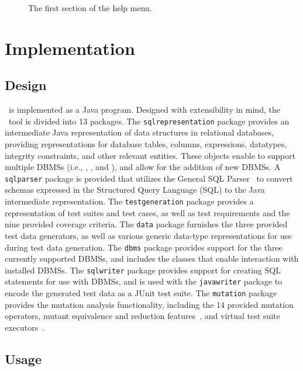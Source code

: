 \begin{figure}

\caption{\label{fig:usage} The first section of the \sa help menu.}
\end{figure}

\section{Implementation}\label{sec:implementation}
\subsection{Design}


\sa~is implemented as a Java program.  Designed with extensibility in mind, the \sa~tool is divided into 13 packages.
The \texttt{sqlrepresentation} package provides an intermediate Java representation of data structures in relational
databases, providing representations for database tables, columns, expressions, datatypes, integrity constraints, and
other relevant entities. These objects enable \sa to support multiple DBMSs (i.e., \sqlite, \postgres, and \hypersql),
and allow for the addition of new DBMSs. A \texttt{sqlparser} package is provided that utilizes the General SQL
Parser~\cite{} to convert schemas expressed in the Structured Query Language (SQL) to the Java intermediate
representation. The \texttt{testgeneration} package provides a representation of test suites and test cases, as well as
test requirements and the nine provided coverage criteria. The \texttt{data} package furnishes the three provided test
data generators, as well as various generic data-type representations for use during test data generation. The
\texttt{dbms} package provides support for the three currently supported DBMSs, and includes the classes that enable
interaction with installed DBMSs. The \texttt{sqlwriter} package provides support for creating SQL statements for use
with DBMSs, and is used with the \texttt{javawriter} package to encode the generated test data as a JUnit test suite.
The \texttt{mutation} package provides the mutation analysis functionality, including the 14 provided mutation
operators, mutant equivalence and reduction features~\cite{wright2014impact}, and virtual test suite
executors~\cite{mcminn2016virtual}.

\subsection{Usage}

